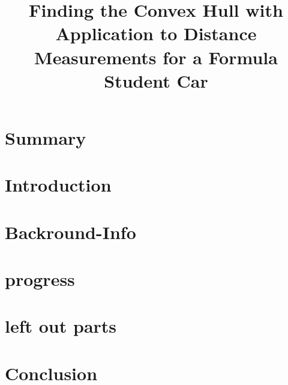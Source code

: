 \documentclass[10pt,a4paper]{article}
\title{Finding the Convex Hull with Application to Distance Measurements for a Formula Student Car}
\begin{document}
	\maketitle
	
	\section{Summary}
	
	\section{Introduction}
	
	\section{Backround-Info}
	
	\section{progress}
	
	\section{left out parts}
	
	\section{Conclusion}
		

	
\end{document}
